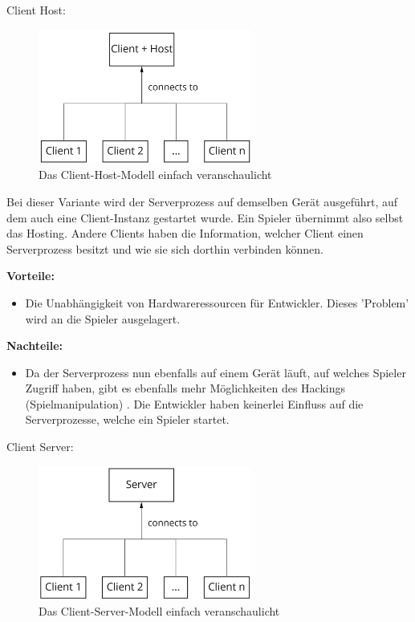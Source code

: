 \textsf{\Large Client Host:}

\begin{figure}[H]
	\centering
	\includegraphics[width=70mm]{images/Client_Host.jpg}
	\caption[Client-Server Modell]{Das Client-Host-Modell einfach veranschaulicht}
	\label{pic:Client_Host}
\end{figure}

Bei dieser Variante wird der Serverprozess auf demselben Gerät ausgeführt, auf dem auch eine Client-Instanz gestartet wurde. Ein Spieler übernimmt also selbst das Hosting. Andere Clients haben die Information, welcher Client einen Serverprozess besitzt und wie sie sich dorthin verbinden können. 

\textbf{Vorteile:}
\begin{itemize}
	\item Die Unabhängigkeit von Hardwareressourcen für Entwickler. Dieses 'Problem' wird an die Spieler ausgelagert. 
\end{itemize}

\textbf{Nachteile:} 
\begin{itemize}
	\item Da der Serverprozess nun ebenfalls auf einem Gerät läuft, auf welches Spieler Zugriff haben, gibt es ebenfalls mehr Möglichkeiten des Hackings (Spielmanipulation) \cite{Wikipedia.2021h}. Die Entwickler haben keinerlei Einfluss auf die Serverprozesse, welche ein Spieler startet\cite{Smed.2002}. 
\end{itemize}

\newpage
\textsf{\Large Client Server:}

\begin{figure}[H]
\centering
\includegraphics[width=70mm]{images/Client_Server.jpg}
\caption[Client-Server Modell]{Das Client-Server-Modell einfach veranschaulicht}
\label{pic:Client_Server}
\end{figure}

